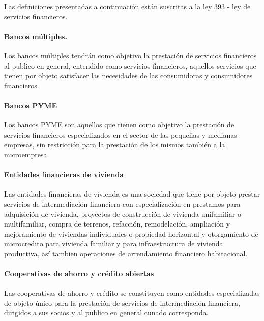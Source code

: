 \documentclass[
  12pt,
]{article}
\begin{document}
Las definiciones presentadas a continuación están suscritas a la ley 393
- ley de servicios financieros.

\hypertarget{bancos-muxfaltiples.}{%
\paragraph{Bancos múltiples.}\label{bancos-muxfaltiples.}}

Los bancos múltiples tendrán como objetivo la prestación de servicios
financieros al publico en general, entendido como servicios financieros,
aquellos servicios que tienen por objeto satisfacer las necesidades de
las consumidoras y consumidores financieros.

\hypertarget{bancos-pyme}{%
\paragraph{Bancos PYME}\label{bancos-pyme}}

Los bancos PYME son aquellos que tienen como objetivo la prestación de
servicios financieros especializados en el sector de las pequeñas y
medianas empresas, sin restricción para la prestación de los mismos
también a la microempresa.

\hypertarget{entidades-financieras-de-vivienda}{%
\paragraph{Entidades financieras de
vivienda}\label{entidades-financieras-de-vivienda}}

Las entidades financieras de vivienda es una sociedad que tiene por
objeto prestar servicios de intermediación financiera con
especialización en prestamos para adquisición de vivienda, proyectos de
construcción de vivienda unifamiliar o multifamiliar, compra de
terrenos, refacción, remodelación, ampliación y mejoramiento de
viviendas individuales o propiedad horizontal y otorgamiento de
microcredito para vivienda familiar y para infraestructura de vivienda
productiva, así tambien operaciones de arrendamiento financiero
habitacional.

\hypertarget{cooperativas-de-ahorro-y-cruxe9dito-abiertas}{%
\paragraph{Cooperativas de ahorro y crédito
abiertas}\label{cooperativas-de-ahorro-y-cruxe9dito-abiertas}}

Las cooperativas de ahorro y crédito se constituyen como entidades
especializadas de objeto único para la prestación de servicios de
intermediación financiera, dirigidos a sus socios y al publico en
general cunado corresponda.
\end{document}
